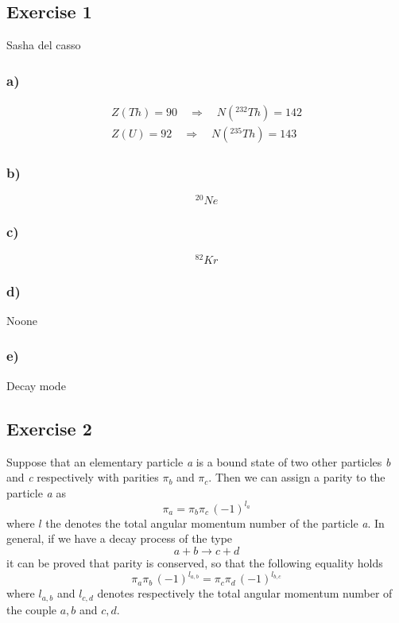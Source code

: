 \subsection*{Exercise 1}

Sasha del casso

\subsubsection*{a)}
\begin{gather*}
    Z(Th) = 90 \quad\Rightarrow\quad N(^{232}Th) = 142 \\
    Z(U) = 92 \quad\Rightarrow\quad N(^{235}Th) = 143
\end{gather*}

\subsubsection*{b)}
$$ ^{20}Ne $$

\subsubsection*{c)}
$$ ^{82}Kr $$

\subsubsection*{d)}
Noone

\subsubsection*{e)}
Decay mode

\subsection*{Exercise 2}
Suppose that an elementary particle \emph{a} is a bound state of two other particles \emph{b} and \emph{c}
respectively with parities $\pi_b$ and $\pi_c$. Then we can assign a parity to the particle \emph{a} as
\begin{equation}
    \pi_a = \pi_b \pi_c \, (-1)^{l_a}
\end{equation}
where $l$ the denotes the total angular momentum number of the particle \emph{a}.
In general, if we have a decay process of the type $$a + b \rightarrow c + d$$ it can be proved that parity
is conserved, so that the following equality holds 
\begin{equation}
     \pi_a \pi_b \, (-1)^{l_{a,b}} = \pi_c \pi_d \, (-1)^{l_{b,c}}
\end{equation}
where $l_{a,b}$ and $l_{c,d}$ denotes respectively the total angular momentum number of the couple $a, b$ 
and $c, d$.


